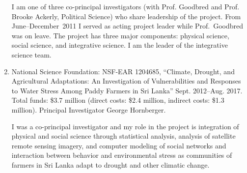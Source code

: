 \begin{enumerate}
	\begin{credit}
		I am one of three co-principal investigators (with Prof. Goodbred and Prof. Brooke Ackerly, Political Science) who share leadership of the project. From June--December~2011 I served as acting project leader while Prof.~Goodbred was on leave. The project has three major components: physical science, social science, and integrative science. I am the leader of the integrative science team.
	\end{credit}
	\item National Science Foundation: NSF-EAR 1204685, ``Climate, Drought, and Agricultural Adaptations: An Investigation of Vulnerabilities and Responses to Water Stress Among Paddy Farmers in Sri Lanka'' Sept. 2012--Aug. 2017. Total funds: \$3.7 million (direct costs: \$2.4 million, indirect costs: \$1.3 million). Principal Investigator George Hornberger. 
	\begin{credit}
		I was a co-principal investigator and my role in the project is integration of physical and social science through statistical analysis, analysis of satellite remote sensing imagery, and computer modeling of social networks and interaction between behavior and environmental stress as communities of farmers in Sri Lanka adapt to drought and other climatic change.
	\end{credit}
\end{enumerate}
\iffalse
